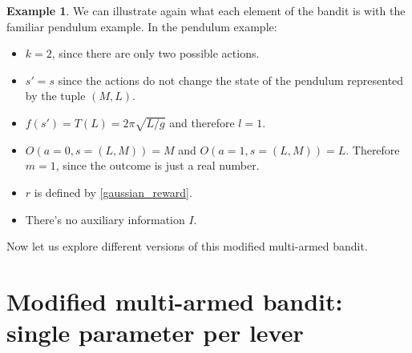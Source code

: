 \documentclass[11pt,a4paper,twoside]{report}
\newcommand{\+}{\textnormal{+} }
\theoremstyle{definition}
\newtheorem{myex}[mythm]{Example}
\numberwithin{equation}{chapter}
\begin{document}

\begin{myex}
  We can illustrate again what each element of the bandit is with the familiar
  pendulum example. In the pendulum example:
  \begin{itemize}
    \item $k=2$, since there are only two possible actions.
    \item $s'=s$ since the actions do not change the state of the pendulum 
    represented by the tuple $(M,L)$.
    \item $f(s')=T(L)=2\pi\sqrt{L/g}$ and therefore $l=1$.
    \item $O(a=0,s=(L,M))=M$ and $O(a=1, s=(L,M))=L$. Therefore $m=1$, since 
    the outcome is just a real number.
    \item $r$ is defined by \eqref{gaussian_reward}.
    \item There's no auxiliary information $I$.
  \end{itemize}
  
\end{myex}

Now let us explore different versions of this modified multi-armed bandit.

\section{Modified multi-armed bandit: single parameter per lever}
\end{document}
